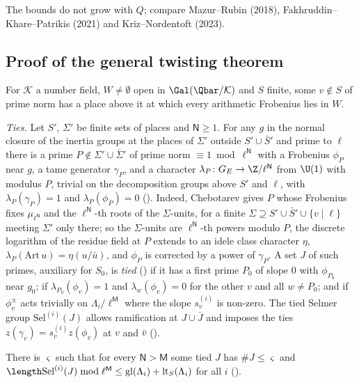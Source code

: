 The bounds do not grow with $Q$; compare Mazur--Rubin (2018), Fakhruddin--Khare--Patrikis (2021) and
Kriz--Nordentoft (2023).

\subsection{Proof of the general twisting theorem}\label{cg-selmer:sec:proof}

\begin{fact}\label{cg-selmer:fact:cheb}
For $\mathcal K$ a number field, $W\ne\emptyset$ open in $\Gal(\Qbar/\mathcal K)$ and $S$ finite, some $v\notin S$ of
prime norm has a place above it at which every arithmetic Frobenius lies in $W$.
\end{fact}

\emph{Ties.} Let $S'$, $\Sigma'$ be finite sets of places and $\mathsf N\ge1$. For any $g$ in the normal closure
of the inertia groups at the places of $\Sigma'$ outside $S'\cup\bar S'$ and prime to $\ell$ there is a
prime $P\notin\Sigma'\cup\bar\Sigma'$ of prime norm $\equiv1\bmod\ell^{\mathsf N}$ with a Frobenius $\phi_P$ near $g$,
a tame generator $\gamma_P$, and a character $\lambda_P\colon G_E\to\Z/\ell^{\mathsf N}$ from $\U(1)$ with
modulus $P$, trivial on the decomposition groups above $S'$ and $\ell$, with $\lambda_P(\gamma_P)=1$
and $\lambda_P(\phi_P)=0$ (). Indeed, Chebotarev gives $P$
whose Frobenius fixes $\mu_{\ell^{\mathsf N}}$ and the $\ell^{\mathsf N}$-th roots of the $\Sigma$-units, for a finite
$\Sigma\supseteq S'\cup\bar S'\cup\{v\mid\ell\}$ meeting $\Sigma'$ only there; so the $\Sigma$-units are $\ell^{\mathsf N}$-th
powers modulo $P$, the discrete logarithm of the residue field at $P$ extends to an idele class
character $\eta$, $\lambda_P(\mathrm{Art}\,u)=\eta(u/\bar u)$, and $\phi_P$ is corrected by a
power of $\gamma_P$. A set $J$ of such primes, auxiliary for $S_0$, is \emph{tied}
() if it
has a first prime $P_0$ of slope $0$ with $\phi_{P_0}$ near $g_0$; if $\lambda_{P_0}(\phi_v)=1$ and
$\lambda_w(\phi_v)=0$ for the other $v$ and all $w\ne P_0$; and if $\phi_v^\pm$ acts trivially on
$\Lambda_i/\ell^{\mathsf M}$ where the slope $s_v^{(i)}$ is non-zero. The tied Selmer group $\mathrm{Sel}^{(i)}(J)$
allows ramification at $J\cup\bar J$ and imposes the ties $z(\gamma_v)=s_v^{(i)}z(\phi_v)$ at $v$
and $\bar v$ ().

\begin{theorem}[Descent]\label{cg-selmer:thm:descent}
There is $\varsigma$ such that for every $\mathsf N>\mathsf M$ some tied $J$ has $\#J\le\varsigma$ and
$\length\mathrm{Sel}^{(i)}(J)\bmod\ell^{\mathsf M}\le\mathrm{gl}(\Lambda_i)+\mathrm{lt}_S(\Lambda_i)$ for all $i$
().
\end{theorem}

